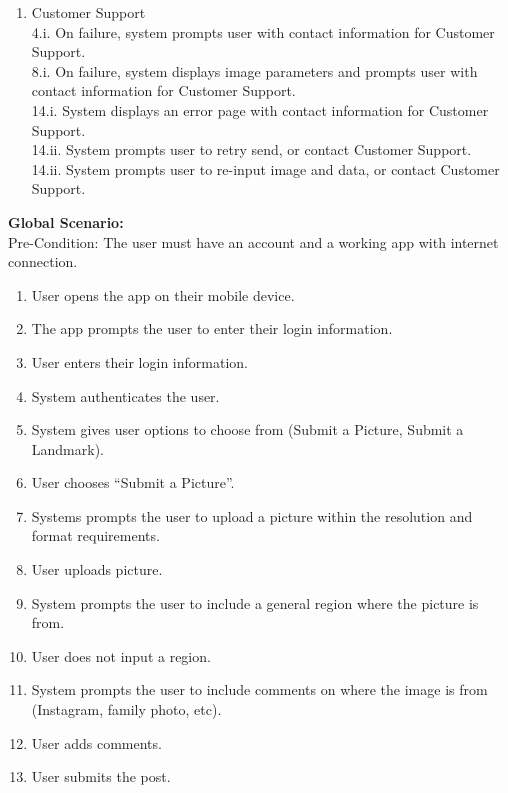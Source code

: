 \documentclass[]{article}
\begin{document}
\begin{enumerate}[{\bf BE1.}]
\begin{enumerate}[{\bf VP1.}]
			\item Customer Support \\
				4.i. On failure, system prompts user with contact          information for Customer Support. \\
                    8.i. On failure, system displays image parameters and prompts user with contact information for Customer Support. \\
                    14.i. System displays an error page with contact information for Customer Support. \\
	            14.ii. System prompts user to retry send, or contact       Customer Support. \\
	            14.ii. System prompts user to re-input image and data,     or contact Customer Support. \\
		\end{enumerate}
		{\bf Global Scenario:}\\
            Pre-Condition: The user must have an account and a working app with internet connection. 
		      \begin{enumerate}[{1.}]
                    \item User opens the app on their mobile device. 
                    \item The app prompts the user to enter their login information.
                    \item User enters their login information.
                    \item System authenticates the user. 
                    \item System gives user options to choose from (Submit a Picture, Submit a Landmark).  
                    \item User chooses “Submit a Picture”. 
                    \item Systems prompts the user to upload a picture within the resolution and format requirements.
                    \item User uploads picture.
                    \item System prompts the user to include a general region where the picture is from. 
                    \item User does not input a region. 
                    \item System prompts the user to include comments on where the image is from (Instagram, family photo, etc). 
                    \item User adds comments.
                    \item User submits the post.

\end{enumerate}
\end{enumerate}
\end{document}
